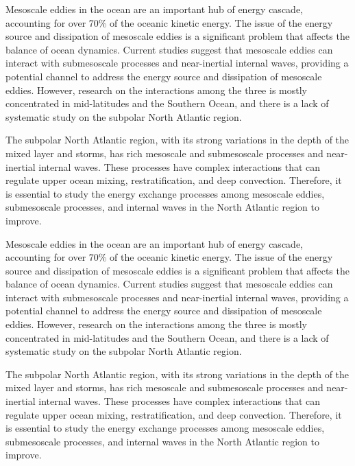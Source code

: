 \begin{enabstract}

Mesoscale eddies in the ocean are an important hub of energy cascade, accounting for over 70\% of the oceanic kinetic energy. The issue of the energy source and dissipation of mesoscale eddies is a significant problem that affects the balance of ocean dynamics. Current studies suggest that mesoscale eddies can interact with submesoscale processes and near-inertial internal waves, providing a potential channel to address the energy source and dissipation of mesoscale eddies. However, research on the interactions among the three is mostly concentrated in mid-latitudes and the Southern Ocean, and there is a lack of systematic study on the subpolar North Atlantic region.

The subpolar North Atlantic region, with its strong variations in the depth of the mixed layer and storms, has rich mesoscale and submesoscale processes and near-inertial internal waves. These processes have complex interactions that can regulate upper ocean mixing, restratification, and deep convection. Therefore, it is essential to study the energy exchange processes among mesoscale eddies, submesoscale processes, and internal waves in the North Atlantic region to improve.

Mesoscale eddies in the ocean are an important hub of energy cascade, accounting for over 70\% of the oceanic kinetic energy. The issue of the energy source and dissipation of mesoscale eddies is a significant problem that affects the balance of ocean dynamics. Current studies suggest that mesoscale eddies can interact with submesoscale processes and near-inertial internal waves, providing a potential channel to address the energy source and dissipation of mesoscale eddies. However, research on the interactions among the three is mostly concentrated in mid-latitudes and the Southern Ocean, and there is a lack of systematic study on the subpolar North Atlantic region.

The subpolar North Atlantic region, with its strong variations in the depth of the mixed layer and storms, has rich mesoscale and submesoscale processes and near-inertial internal waves. These processes have complex interactions that can regulate upper ocean mixing, restratification, and deep convection. Therefore, it is essential to study the energy exchange processes among mesoscale eddies, submesoscale processes, and internal waves in the North Atlantic region to improve.


\end{enabstract}

